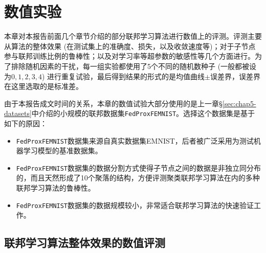 \chapter{\hspace{-1mm}\bf 数值实验}
\label{chap6}


本章对本报告前面几个章节介绍的部分联邦学习算法进行数值上的评测。评测主要从算法的整体效果 (在测试集上的准确度、损失，以及收敛速度等)；对于子节点参与联邦训练比例的鲁棒性；以及对学习率等超参数的敏感性等几个方面进行。为了排除随机因素的干扰，每一组实验都使用了5个不同的随机数种子 (一般都被设为$0, 1, 2, 3, 4$) 进行重复试验，最后得到结果的形式的是均值曲线$\pm$误差界，误差界在这里选取的是标准差。

由于本报告成文时间的关系，本章的数值试验大部分使用的是上一章\S\ref{sec:chap5-datasets}中介绍的小规模的联邦数据集\texttt{FedProxFEMNIST}。选择这个数据集是基于如下的原因：
\begin{itemize}
    \item \texttt{FedProxFEMNIST}数据集来源自真实数据集EMNIST\cite{cohen2017emnist}，后者被广泛采用为测试机器学习模型的基准数据集。
    \item \texttt{FedProxFEMNIST}数据集的数据分割方式使得子节点之间的数据是非独立同分布的，而且天然形成了10个聚落的结构，方便评测聚类联邦学习算法\cite{Ghosh_2022_cfl, Sattler_2021_cfl}在内的多种联邦学习算法的鲁棒性。
    \item \texttt{FedProxFEMNIST}数据集的数据规模较小，非常适合联邦学习算法的快速验证工作。
\end{itemize}

\section{联邦学习算法整体效果的数值评测}
\label{sec:chap6-overall}


